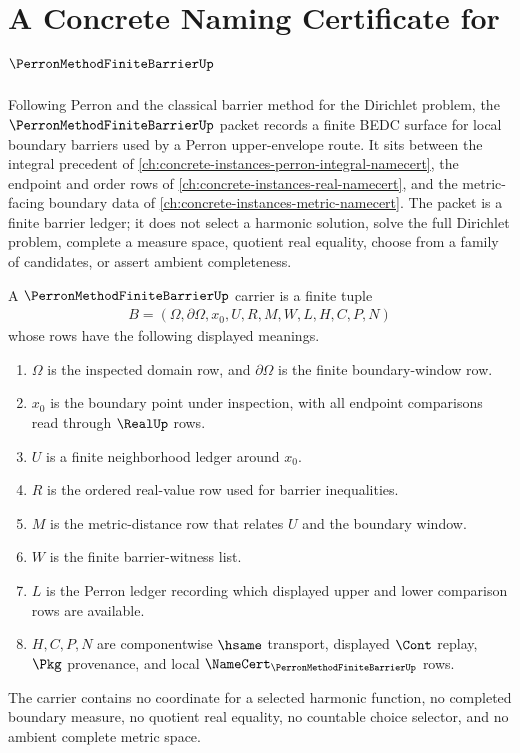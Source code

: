 \chapter{A Concrete Naming Certificate for $\PerronMethodFiniteBarrierUp$}
\label{ch:concrete-instances-perron-method-finite-barrier-namecert}

Following Perron and the classical barrier method for the Dirichlet problem, the $\PerronMethodFiniteBarrierUp$ packet records a finite BEDC surface for local boundary barriers used by a Perron upper-envelope route. It sits between the integral precedent of \autoref{ch:concrete-instances-perron-integral-namecert}, the endpoint and order rows of \autoref{ch:concrete-instances-real-namecert}, and the metric-facing boundary data of \autoref{ch:concrete-instances-metric-namecert}. The packet is a finite barrier ledger; it does not select a harmonic solution, solve the full Dirichlet problem, complete a measure space, quotient real equality, choose from a family of candidates, or assert ambient completeness.

\begin{definition}
\label{def:perron-method-finite-barrier-carrier}
A $\PerronMethodFiniteBarrierUp$ carrier is a finite tuple
$$
\begin{gathered}
B=(\Omega,\partial\Omega,x_0,U,R,M,W,L,H,C,P,N)
\end{gathered}
$$
whose rows have the following displayed meanings.
\begin{enumerate}
\item $\Omega$ is the inspected domain row, and $\partial\Omega$ is the finite boundary-window row.
\item $x_0$ is the boundary point under inspection, with all endpoint comparisons read through $\RealUp$ rows.
\item $U$ is a finite neighborhood ledger around $x_0$.
\item $R$ is the ordered real-value row used for barrier inequalities.
\item $M$ is the metric-distance row that relates $U$ and the boundary window.
\item $W$ is the finite barrier-witness list.
\item $L$ is the Perron ledger recording which displayed upper and lower comparison rows are available.
\item $H,C,P,N$ are componentwise $\hsame$ transport, displayed $\Cont$ replay, $\Pkg$ provenance, and local $\NameCert_{\PerronMethodFiniteBarrierUp}$ rows.
\end{enumerate}
The carrier contains no coordinate for a selected harmonic function, no completed boundary measure, no quotient real equality, no countable choice selector, and no ambient complete metric space.
\end{definition}

